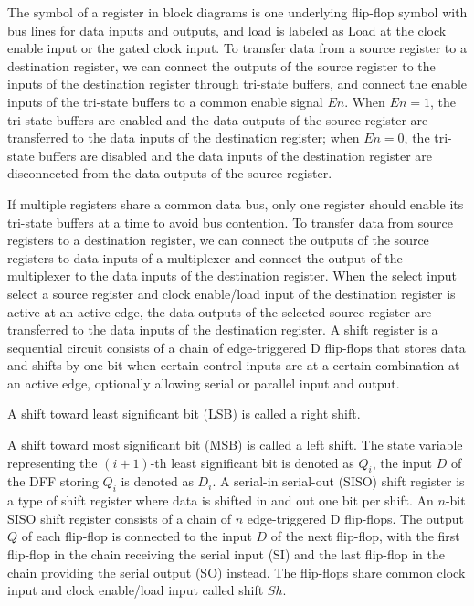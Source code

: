\documentclass[a4paper,12pt]{report}
\begin{document}
The symbol of a register in block diagrams is one underlying flip-flop symbol with bus lines for data inputs and outputs, and load is labeled as Load at the clock enable input or the gated clock input.
To transfer data from a source register to a destination register, we can connect the outputs of the source register to the inputs of the destination register through tri-state buffers, and connect the enable inputs of the tri-state buffers to a common enable signal $En$. When $En=1$, the tri-state buffers are enabled and the data outputs of the source register are transferred to the data inputs of the destination register; when $En=0$, the tri-state buffers are disabled and the data inputs of the destination register are disconnected from the data outputs of the source register.

If multiple registers share a common data bus, only one register should enable its tri-state buffers at a time to avoid bus contention.
To transfer data from source registers to a destination register, we can connect the outputs of the source registers to data inputs of a multiplexer and connect the output of the multiplexer to the data inputs of the destination register. When the select input select a source register and clock enable/load input of the destination register is active at an active edge, the data outputs of the selected source register are transferred to the data inputs of the destination register.
A shift register is a sequential circuit consists of a chain of edge-triggered D flip-flops that stores data and shifts by one bit when certain control inputs are at a certain combination at an active edge, optionally allowing serial or parallel input and output.
\bit
\item A shift toward least significant bit (LSB) is called a right shift.
\item A shift toward most significant bit (MSB) is called a left shift.
\eit
The state variable representing the $(i+1)$-th least significant bit is denoted as $Q_i$, the input $D$ of the DFF storing $Q_i$ is denoted as $D_i$.
A serial-in serial-out (SISO) shift register is a type of shift register where data is shifted in and out one bit per shift. An $n$-bit SISO shift register consists of a chain of $n$ edge-triggered D flip-flops. The output $Q$ of each flip-flop is connected to the input $D$ of the next flip-flop, with the first flip-flop in the chain receiving the serial input (SI) and the last flip-flop in the chain providing the serial output (SO) instead. The flip-flops share common clock input and clock enable/load input called shift $Sh$.
\end{document}
